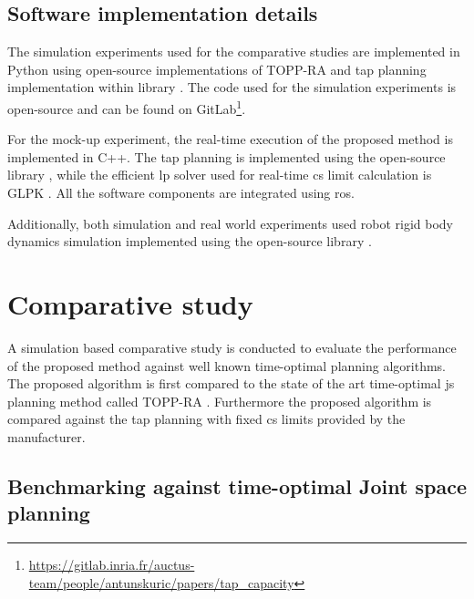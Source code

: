 \subsection{Software implementation details}
The simulation experiments used for the comparative studies are implemented in Python
using open-source implementations of TOPP-RA \cite{Pham2018} and \gls{tap} planning implementation within  library \cite{ruckig}. The code used for the simulation experiments is open-source and can be found on GitLab\footnote{\url{https://gitlab.inria.fr/auctus-team/people/antunskuric/papers/tap_capacity}}.

For the mock-up experiment, the real-time execution of the proposed method is implemented in C++. The \gls{tap} planning is implemented using the open-source library  \cite{ruckig}, while the efficient \gls{lp} solver used for real-time \gls{cs} limit calculation is GLPK \cite{glpk}. All the software components are integrated using \gls{ros}.

Additionally, both simulation and real world experiments used robot rigid body dynamics simulation implemented using the open-source library  \cite{pinocchio2021}. 



\section{Comparative study}
\label{ch:comp_study}
A simulation based comparative study is conducted to evaluate the performance of the proposed method against well known time-optimal planning algorithms. The proposed algorithm is first compared to the state of the art time-optimal \gls{js} planning method called TOPP-RA \cite{Pham2018}. Furthermore the proposed algorithm is compared against the \gls{tap} planning with fixed \gls{cs} limits provided by the manufacturer.

\subsection{Benchmarking against time-optimal Joint space planning}

